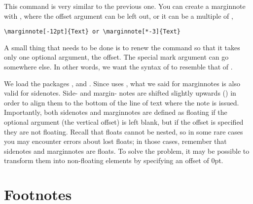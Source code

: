This command is very similar to the previous one. You can create a 
marginnote with , where the offset 
argument can be left out, or it can be a multiple of 
, 
\eg

\begin{lstlisting}[style=kaolstplain]
\marginnote[-12pt]{Text} or \marginnote[*-3]{Text}
\end{lstlisting}

\begin{kaobox}[title=To Do]
A small thing that needs to be done is to renew the  
command so that it takes only one optional argument, the offset. The 
special mark argument can go somewhere else. In other words, we want the 
syntax of  to resemble that of .
\end{kaobox}

We load the packages ,  and 
. Since  uses , 
what we said for marginnotes is also valid for sidenotes. Side- and 
margin- notes are shifted slightly upwards 
() in 
order to align them to the bottom of the line of text where the note is 
issued. Importantly, both sidenotes and marginnotes are defined as 
floating if the optional argument (\ie the vertical offset) is left 
blank, but if the offset is specified they are not floating. Recall that 
floats cannot be nested, so in some rare cases you may encounter errors 
about lost floats; in those cases, remember that sidenotes and 
marginnotes are floats. To solve the problem, it may be possible to 
transform them into non-floating elements by specifying an offset of 
0pt.

\section{Footnotes}

